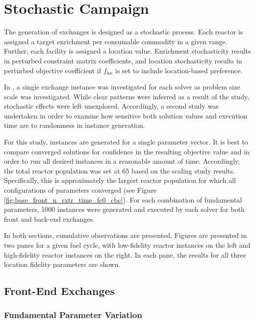 
\section{Stochastic Campaign}\label{results:stochastic}

The generation of exchanges is designed as a stochastic process. Each reactor is
assigned a target enrichment per consumable commodity in a given range. Further,
each facility is assigned a location value. Enrichment stochasticity results in
perturbed constraint matrix coefficients, and location stochasticity results in
perturbed objective coefficient if $f_{\text{loc}}$ is set to include
location-based preference.

In , a single exchange instance was investigated for each
solver as problem size scale was investigated. While clear patterns were
inferred as a result of the study, stochastic effects were left
unexplored. Accordingly, a second study was undertaken in order to examine how
sensitive both solution values and execution time are to randomness in instance
generation.

For this study, instances are generated for a single parameter vector. It is
best to compare converged \cbc solutions for confidence in the resulting
objective value and in order to run all desired instances in a reasonable amount
of time. Accordingly, the total reactor population was set at 65 based on the
scaling study results. Specifically, this is approximately the largest reactor
population for which all configurations of parameters converged (see Figure
\ref{fig:base_front_n_rxtr_time_fc0_cbc}). For each combination of fundamental
parameters, 1000 instances were generated and executed by each solver for both
front and back-end exchanges.

In both sections, cumulative observations are presented. Figures are presented
in two panes for a given fuel cycle, with low-fidelity reactor instances on the
left and high-fidelity reactor instances on the right. In each pane, the results
for all three location fidelity parameters are shown.

\subsection{Front-End Exchanges}

\subsubsection{Fundamental Parameter Variation}


